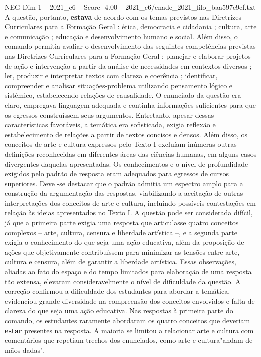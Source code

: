 \begin{textsample}{NEG Dim 1 – 2021\_c6 – Score -4.00 – 2021\_c6/enade\_2021\_filo\_baa597e9cf.txt}
A questão, portanto, \textbf{estava} de acordo com os temas previstos nas Diretrizes Curriculares para a Formação Geral : ética, democracia e cidadania ; cultura, arte e comunicação ; educação e desenvolvimento humano e social.
Além disso, o comando permitia avaliar o desenvolvimento das seguintes competências previstas nas Diretrizes Curriculares para a Formação Geral : planejar e elaborar projetos de ação e intervenção a partir da análise de necessidades em contextos diversos ; ler, produzir e interpretar textos com clareza e coerência ; identificar, compreender e analisar situações-problema utilizando pensamento lógico e sistêmico, estabelecendo relações de causalidade.
O enunciado da questão era claro, empregava linguagem adequada e continha informações suficientes para que os egressos construíssem seus argumentos.
Entretanto, apesar dessas características favoráveis, a temática era sofisticada, exigia reflexão e estabelecimento de relações a partir de textos concisos e densos.
Além disso, os conceitos de arte e cultura expressos pelo Texto I excluíam inúmeras outras definições reconhecidas em diferentes áreas das ciências humanas, em alguns casos divergentes daquelas apresentadas.
Os conhecimentos e o nível de profundidade exigidos pelo padrão de resposta eram adequados para egressos de cursos superiores.
Deve -se destacar que o padrão admitia um espectro amplo para a construção da argumentação das respostas, viabilizando a aceitação de outras interpretações dos conceitos de arte e cultura, incluindo possíveis contestações em relação às ideias apresentados no Texto I.
A questão pode ser considerada difícil, já que a primeira parte exigia uma resposta que articulasse quatro conceitos complexos – arte, cultura, censura e liberdade artística –, e a segunda parte exigia o conhecimento do que seja uma ação educativa, além da proposição de ações que objetivamente contribuíssem para minimizar as tensões entre arte, cultura e censura, além de garantir a liberdade artística.
Essas observações, aliadas ao fato do espaço e do tempo limitados para elaboração de uma resposta tão extensa, elevaram consideravelmente o nível de dificuldade da questão.
A correção confirmou a dificuldade dos estudantes para abordar a temática, evidenciou grande diversidade na compreensão dos conceitos envolvidos e falta de clareza do que seja uma ação educativa.
Nas respostas à primeira parte do comando, os estudantes raramente abordaram os quatro conceitos que deveriam \textbf{estar} presentes na resposta.
A maioria se limitou a relacionar arte e cultura com comentários que repetiam trechos dos enunciados, como arte e cultura"andam de mãos dadas".

\end{textsample}
